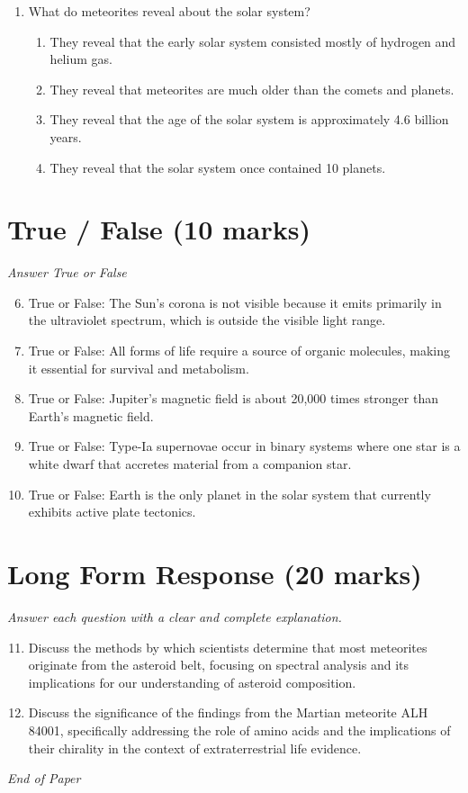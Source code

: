 \documentclass[12pt]{article}
\begin{document}
\begin{enumerate}[label=\arabic*.]
\begin{enumerate}[label=(\alph*)]
    \item 1.5 x 1014 meters
    \item 1.5 x 1017 meters
\end{enumerate}
\item What do meteorites reveal about the solar system?
\begin{enumerate}[label=(\alph*)]
    \item They reveal that the early solar system consisted mostly of hydrogen and helium gas.
    \item They reveal that meteorites are much older than the comets and planets.
    \item They reveal that the age of the solar system is approximately 4.6 billion years.
    \item They reveal that the solar system once contained 10 planets.
\end{enumerate}
\end{enumerate}

\section*{True / False (10 marks)}
\textit{Answer True or False}
\begin{enumerate}[label=\arabic*.]
\setcounter{enumi}{5}
\item True or False: The Sun's corona is not visible because it emits primarily in the ultraviolet spectrum, which is outside the visible light range.
\item True or False: All forms of life require a source of organic molecules, making it essential for survival and metabolism.
\item True or False: Jupiter's magnetic field is about 20,000 times stronger than Earth's magnetic field.
\item True or False: Type-Ia supernovae occur in binary systems where one star is a white dwarf that accretes material from a companion star.
\item True or False: Earth is the only planet in the solar system that currently exhibits active plate tectonics.
\end{enumerate}

\section*{Long Form Response (20 marks)}
\textit{Answer each question with a clear and complete explanation.}
\begin{enumerate}[label=\arabic*.]
\setcounter{enumi}{10}
\item Discuss the methods by which scientists determine that most meteorites originate from the asteroid belt, focusing on spectral analysis and its implications for our understanding of asteroid composition.
\item Discuss the significance of the findings from the Martian meteorite ALH 84001, specifically addressing the role of amino acids and the implications of their chirality in the context of extraterrestrial life evidence.
\end{enumerate}

\vfill
\noindent\textit{End of Paper}
\end{document}
